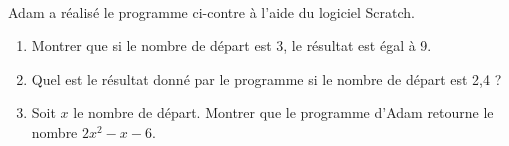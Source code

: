 \vfill
\pagebreak


\begin{activite}
   \ \\ [-16mm]
   \begin{QCM}
      \begin{minipage}{8cm}
      Adam a réalisé le programme ci-contre à l’aide du logiciel Scratch.
         \begin{enumerate}
            \item Montrer que si le nombre de départ est 3, le résultat est égal à 9.
            \item Quel est le résultat donné par le programme si le nombre de départ est 2,4 ?
            \item Soit $x$ le nombre de départ. Montrer que le programme d’Adam retourne le nombre $2x^2-x-6$.           
         \end{enumerate}
      \end{minipage}
      \hfill
      \begin{minipage}{8cm}
         \begin{scratch}
         \end{scratch} \\ [7mm]
      \end{minipage}
   \end{QCM}
   
   \bigskip
   

\end{activite}
